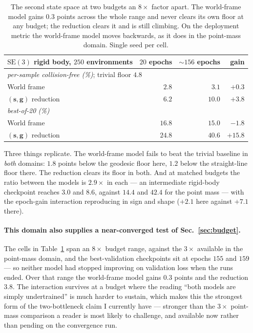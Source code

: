 \documentclass[11pt,a4paper]{article}
\newcommand{\toprule}{\hline}
\newcommand{\midrule}{\hline}
\newcommand{\bottomrule}{\hline}
\newcommand{\svec}{\mathbf{s}}
\newcommand{\gvec}{\mathbf{g}}
\newcommand{\SE}{\mathrm{SE}(3)}
\begin{document}
\begin{table}[t]
\centering
\begin{tabular}{lrrr}
\toprule
$\SE$ rigid body, $250$ environments & $20$ epochs & ${\sim}156$ epochs & gain \\
\midrule
\multicolumn{4}{l}{\emph{per-sample collision-free (\%)}; trivial floor $4.8$}\\
World frame               & $2.8$  & $3.1$  & $+0.3$ \\
$(\svec,\gvec)$ reduction & $6.2$  & $\mathbf{10.0}$ & $+3.8$ \\[3pt]
\multicolumn{4}{l}{\emph{best-of-20 (\%)}}\\
World frame               & $16.8$ & $15.0$ & $-1.8$ \\
$(\svec,\gvec)$ reduction & $24.8$ & $\mathbf{40.6}$ & $+15.8$ \\
\bottomrule
\end{tabular}
\caption{The second state space at two budgets an $8\times$ factor apart. The
world-frame model gains $0.3$ points across the whole range and never clears its
own floor at any budget; the reduction clears it and is still climbing. On the
deployment metric the world-frame model moves backwards, as it does in the
point-mass domain. Single seed per cell.}
\label{tab:se3}
\end{table}

Three things replicate. The world-frame model fails to beat the trivial baseline in
\emph{both} domains: $1.8$ points below the geodesic floor here, $1.2$ below the
straight-line floor there. The reduction clears its floor in both. And at matched
budgets the ratio between the models is $2.9\times$ in each --- an intermediate
rigid-body checkpoint reaches $3.0$ and $8.6$, against $14.4$ and $42.4$ for the
point mass --- with the epoch-gain interaction reproducing in sign and shape
($+2.1$ here against $+7.1$ there).

\paragraph{This domain also supplies a near-converged test of
Sec.~\ref{sec:budget}.} The cells in Table~\ref{tab:se3} span an $8\times$ budget
range, against the $3\times$ available in the point-mass domain, and the
best-validation checkpoints sit at epochs $155$ and $159$ --- so neither model had
stopped improving on validation loss when the runs ended. Over that range the
world-frame model gains $0.3$ points and the reduction $3.8$. The interaction
survives at a budget where the reading ``both models are simply undertrained'' is
much harder to sustain, which makes this the strongest form of the two-bottleneck
claim I currently have --- stronger than the $3\times$ point-mass comparison a
reader is most likely to challenge, and available now rather than pending on the
convergence run.
\end{document}
